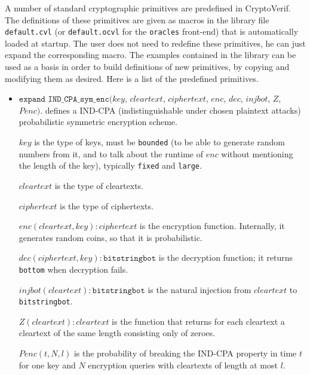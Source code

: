 \documentclass{article}
\begin{document}
\newcommand{\vn}[1]{\mathit{#1}}
\newcommand{\ab}{\allowbreak}

\sloppy

A number of standard cryptographic primitives are predefined in
CryptoVerif.  The definitions of these primitives are given as macros
in the library file \texttt{default.cvl} (or \texttt{default.ocvl} for
the \texttt{oracles} front-end) that is automatically loaded at
startup.  The user does not need to redefine these primitives, he can
just expand the corresponding macro. The examples contained in the library
can be used as a basis in order to build definitions of new primitives, by copying
and modifying them as desired. Here is a list of the predefined primitives.
\begin{itemize}

\item $\texttt{expand IND\_CPA\_sym\_enc(}\vn{key}$,
  $\vn{cleartext}$, $\vn{ciphertext}$, $\vn{enc}$,
  $\vn{dec}$, $\vn{injbot}$, $\vn{Z}$, $\vn{Penc}\texttt{).}$ defines a
  IND-CPA (indistinguishable under chosen plaintext attacks)
  probabilistic symmetric encryption scheme.

   $\vn{key}$ is the type of keys, must be \texttt{bounded} (to be able to generate random numbers from it, and to talk about the runtime of $\vn{enc}$ without mentioning the length of the key), typically \texttt{fixed} and \texttt{large}.

   $\vn{cleartext}$ is the type of cleartexts.

   $\vn{ciphertext}$ is the type of ciphertexts.

   $\vn{enc}(\vn{cleartext}, \vn{key}): \vn{ciphertext}$ is the encryption function. Internally, it generates random coins, so that it is probabilistic.

   $\vn{dec}(\vn{ciphertext}, \vn{key}): \texttt{bitstringbot}$ is the
  decryption function; it returns \texttt{bottom} when decryption
  fails.

   $\vn{injbot}(\vn{cleartext}): \texttt{bitstringbot}$ is the natural
  injection from $\vn{cleartext}$ to \texttt{bitstringbot}.

   $\vn{Z}(\vn{cleartext}): \vn{cleartext}$ is the function that
  returns for each cleartext a cleartext of the same length consisting
  only of zeroes.

  $\vn{Penc}(t, N, l)$ is the probability of breaking the IND-CPA
  property in time $t$ for one key and $N$ encryption queries with
  cleartexts of length at most $l$.


\end{itemize}
\end{document}
